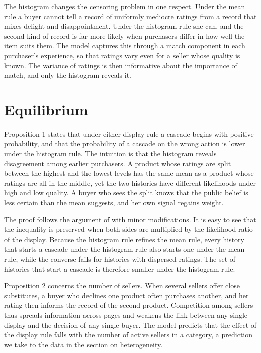 \documentclass[12pt]{article}
\begin{document}
The histogram changes the censoring problem in one respect. Under the mean rule a buyer cannot tell a record of uniformly mediocre ratings from a record that mixes delight and disappointment. Under the histogram rule she can, and the second kind of record is far more likely when purchasers differ in how well the item suits them. The model captures this through a match component in each purchaser's experience, so that ratings vary even for a seller whose quality is known. The variance of ratings is then informative about the importance of match, and only the histogram reveals it.

\section{Equilibrium}
Proposition 1 states that under either display rule a cascade begins with positive probability, and that the probability of a cascade on the wrong action is lower under the histogram rule. The intuition is that the histogram reveals disagreement among earlier purchasers. A product whose ratings are split between the highest and the lowest levels has the same mean as a product whose ratings are all in the middle, yet the two histories have different likelihoods under high and low quality. A buyer who sees the split knows that the public belief is less certain than the mean suggests, and her own signal regains weight.

The proof follows the argument of \citet{bikhchandani1992} with minor modifications. It is easy to see that the inequality is preserved when both sides are multiplied by the likelihood ratio of the display. Because the histogram rule refines the mean rule, every history that starts a cascade under the histogram rule also starts one under the mean rule, while the converse fails for histories with dispersed ratings. The set of histories that start a cascade is therefore smaller under the histogram rule.

Proposition 2 concerns the number of sellers. When several sellers offer close substitutes, a buyer who declines one product often purchases another, and her rating then informs the record of the second product. Competition among sellers thus spreads information across pages and weakens the link between any single display and the decision of any single buyer. The model predicts that the effect of the display rule falls with the number of active sellers in a category, a prediction we take to the data in the section on heterogeneity.
\end{document}
